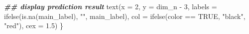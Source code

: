 \documentclass[
]{book}
\newenvironment{Shaded}{\begin{snugshade}}{\end{snugshade}}
\newcommand{\AttributeTok}[1]{\textcolor[rgb]{0.77,0.63,0.00}{#1}}
\newcommand{\ConstantTok}[1]{\textcolor[rgb]{0.00,0.00,0.00}{#1}}
\newcommand{\DecValTok}[1]{\textcolor[rgb]{0.00,0.00,0.81}{#1}}
\newcommand{\DocumentationTok}[1]{\textcolor[rgb]{0.56,0.35,0.01}{\textbf{\textit{#1}}}}
\newcommand{\FloatTok}[1]{\textcolor[rgb]{0.00,0.00,0.81}{#1}}
\newcommand{\FunctionTok}[1]{\textcolor[rgb]{0.00,0.00,0.00}{#1}}
\newcommand{\NormalTok}[1]{#1}
\newcommand{\SpecialCharTok}[1]{\textcolor[rgb]{0.00,0.00,0.00}{#1}}
\newcommand{\StringTok}[1]{\textcolor[rgb]{0.31,0.60,0.02}{#1}}
\begin{document}
\begin{Shaded}
\begin{Highlighting}[]
  \DocumentationTok{\#\# display prediction result}
  \FunctionTok{text}\NormalTok{(}\AttributeTok{x =} \DecValTok{2}\NormalTok{,}
       \AttributeTok{y =}\NormalTok{ dim\_n }\SpecialCharTok{{-}} \DecValTok{3}\NormalTok{,}
       \AttributeTok{labels =} \FunctionTok{ifelse}\NormalTok{(}\FunctionTok{is.na}\NormalTok{(main\_label),}
                       \StringTok{""}\NormalTok{,}
\NormalTok{                       main\_label),}
       \AttributeTok{col =} \FunctionTok{ifelse}\NormalTok{(color }\SpecialCharTok{==} \ConstantTok{TRUE}\NormalTok{,}
                    \StringTok{"black"}\NormalTok{,}
                    \StringTok{"red"}\NormalTok{),}
       \AttributeTok{cex =} \FloatTok{1.5}\NormalTok{)}
\NormalTok{\}}
\end{Highlighting}
\end{Shaded}
\end{document}
